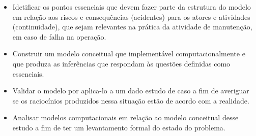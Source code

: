 \begin{itemize}
    \item Idetificar os pontos essenciais que devem fazer parte da estrutura do modelo em relação aos riscos e consequências (acidentes) para os atores e atividades (continuidade), que sejam relevantes na prática da atividade de manutenção, em caso de falha na operação. 
    \item Construir um modelo conceitual que implementável computacionalmente e que produza as inferências que respondam às questões definidas como essenciais.
    \item Validar o modelo por aplica-lo a um dado estudo de caso a fim de averiguar se os raciocínios produzidos nessa situação estão de acordo com a realidade.  
    \item Analisar modelos computacionais em relação ao modelo conceitual desse estudo a fim de ter um levantamento formal do estado do problema.
\end{itemize}